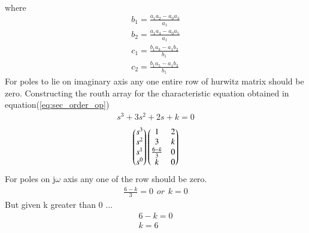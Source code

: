 \begin{enumerate}[label=\thesection.\arabic*.,ref=\thesection.\theenumi]
 \\
 where
 \begin{align}
 b_1 =\frac{ a_1a_2-a_0a_3}{a_1}  
 \\
 b_2 =\frac{ a_1a_4-a_0a_5}{a_1} 
 \\
 c_1=\frac{ b_1a_3-a_1b_2}{b_1} 
\\
 c_2=\frac{ b_1a_5-a_1b_3}{b_1}  
\end{align}
For poles to lie on imaginary axis any one entire row of hurwitz matrix should be zero.
Constructing the routh array for the characteristic equation obtained in equation(\ref{eq:sec_order_op})
\begin{align}
 s^3+3s^2+2s+k = 0
\end{align}
%
\begin{align}
\begin{pmatrix}s^3\\s^2\\s^1 \\ s^0\end{pmatrix}
\begin{pmatrix}1 & 2 \\ 3 & k \\  \frac{6-k}{3} & 0\\ k & 0\end{pmatrix}
\end{align}
For poles on j$\omega$ axis any one of the row should be zero.
\begin{align}
\frac{6-k}{3} = 0 \hspace{5pt} or\hspace{5pt} k = 0
\end{align}
But given k greater than 0 ...
\begin{align}
   6-k = 0\\
   k = 6
\end{align}
\end{enumerate}
